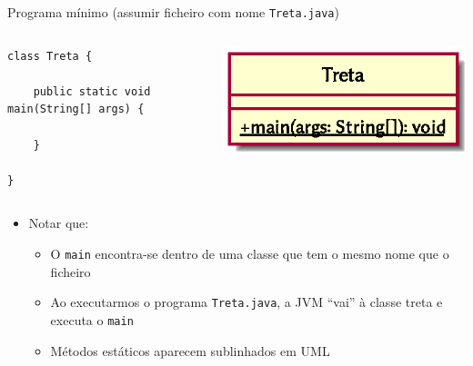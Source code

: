 \documentclass[portuguese, aspectratio=169, xcolor=table]{beamer}
\begin{document}
\begin{frame}[fragile]{Programa mínimo (assumir ficheiro com nome \texttt{Treta.java})}
\begin{columns}
    \begin{verbatim}
class Treta {
    
    public static void main(String[] args) {
        
    }
    
}
\end{verbatim}
\begin{center}
    \includegraphics[width=0.5\linewidth]{./uml_diagrams/class1}
\end{center}
\end{columns}
\vfill

\begin{itemize}
    \item Notar que:
    \begin{itemize}
        \item O \texttt{main} encontra-se dentro de uma classe que tem o mesmo nome que o ficheiro
        \item Ao executarmos o programa \texttt{Treta.java}, a JVM ``vai'' à classe treta e executa o \texttt{main}
        \item Métodos estáticos aparecem sublinhados em UML
    \end{itemize}
\end{itemize}
\end{frame}
\end{document}
